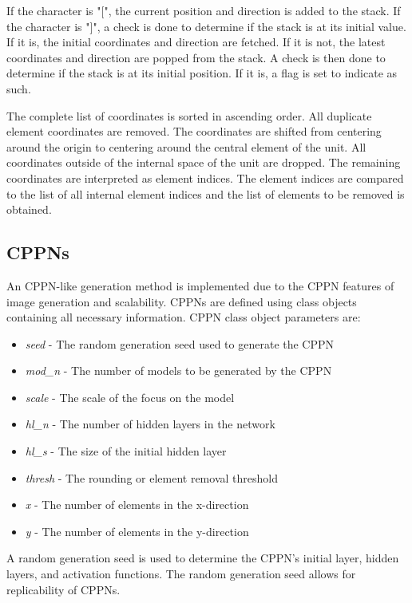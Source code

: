 If the character is "[", the current position and direction is added to the stack. If the character is "]", a check is done to determine if the stack is at its initial value. If it is, the initial coordinates and direction are fetched. If it is not, the latest coordinates and direction are popped from the stack. A check is then done to determine if the stack is at its initial position. If it is, a flag is set to indicate as such.

The complete list of coordinates is sorted in ascending order. All duplicate element coordinates are removed. The coordinates are shifted from centering around the origin to centering around the central element of the unit. All coordinates outside of the internal space of the unit are dropped. The remaining coordinates are interpreted as element indices. The element indices are compared to the list of all internal element indices and the list of elements to be removed is obtained.

\subsection{CPPNs}
\label{ssec:CPPN}

An CPPN-like generation method is implemented due to the CPPN features of image generation and scalability. CPPNs are defined using class objects containing all necessary information. CPPN class object parameters are:

\begin{itemize}
	\item \textit{seed} - The random generation seed used to generate the CPPN
	\item \textit{mod\_n} - The number of models to be generated by the CPPN
	\item \textit{scale} - The scale of the focus on the model
	\item \textit{hl\_n} - The number of hidden layers in the network
	\item \textit{hl\_s} - The size of the initial hidden layer
	\item \textit{thresh} - The rounding or element removal threshold
	\item \textit{x} - The number of elements in the x-direction
	\item \textit{y} - The number of elements in the y-direction
\end{itemize}

A random generation seed is used to determine the CPPN's initial layer, hidden layers, and activation functions. The random generation seed allows for replicability of CPPNs.

